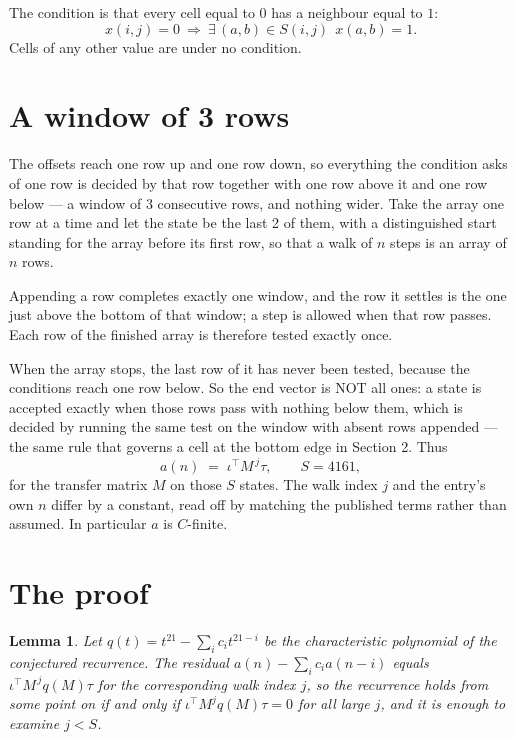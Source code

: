 \documentclass[11pt,a4paper]{article}
\theoremstyle{plain}
\newtheorem{lemma}[theorem]{Lemma}
\theoremstyle{definition}
\begin{document}
The condition is that every cell equal to $0$ has a neighbour equal to $1$:
\[
x(i,j)=0\ \Longrightarrow\ \exists\,(a,b)\in S(i,j)\ \ x(a,b)=1 .
\]
Cells of any other value are under no condition.

\section{A window of 3 rows}

The offsets reach one row up and one row down, so everything the condition asks of one row is
decided by that row together with one row above it and one row below --- a window of
$3$ consecutive rows, and nothing wider. Take the array one row at a time and
let the state be the last 2 of them, with a distinguished start standing for the array before its
first row, so that a walk of $n$ steps is an array of $n$ rows.

Appending a row completes exactly one window, and the row it settles is the one just above the bottom of that window; a step is
allowed when that row passes. Each row of the finished array is therefore tested exactly once.

When the array stops, the last row of it has never been tested, because the
conditions reach one row below. So the end vector is NOT all ones: a state is accepted exactly when
those rows pass with nothing below them, which is decided by running the same test on the window
with absent rows appended --- the same rule that governs a cell at the bottom edge in
Section 2.
Thus
\[
a(n)\;=\;\iota^{\!\top}M^{\,j}\tau ,\qquad S=4161,
\]
for the transfer matrix $M$ on those $S$ states. The walk index $j$ and the entry's own $n$
differ by a constant, read off by matching the published terms rather than assumed. In
particular $a$ is $C$-finite.

\section{The proof}

\begin{lemma}\label{lem:crit}
Let $q(t)=t^{21}-\sum_i c_it^{21-i}$ be the characteristic polynomial of the
conjectured recurrence. The residual $a(n)-\sum_ic_ia(n-i)$ equals
$\iota^{\!\top}M^{\,j}q(M)\tau$ for the corresponding walk index $j$, so the recurrence
holds from some point on if and only if $\iota^{\!\top}M^{j}q(M)\tau=0$ for all large $j$,
and it is enough to examine $j<S$.
\end{lemma}
\end{document}
